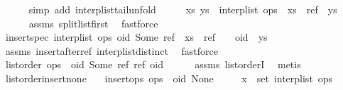 \begin{isabellebody}
\ \ \ \ \isamarkupfalse%
\ {\isacharparenleft}simp\ add{\isacharcolon}\ interp{\isacharunderscore}list{\isacharunderscore}tail{\isacharunderscore}unfold{\isacharparenright}\isanewline
\ \ \isamarkupfalse%
\ \isamarkupfalse%
\ xs\ ys\ \ {\isachardoublequoteopen}interp{\isacharunderscore}list\ ops\ {\isacharequal}\ xs\ {\isacharat}\ {\isacharbrackleft}ref{\isacharbrackright}\ {\isacharat}\ ys{\isachardoublequoteclose}\isanewline
\ \ \ \ \isamarkupfalse%
\ assms{\isacharparenleft}{}{\isacharparenright}\ split{\isacharunderscore}list{\isacharunderscore}first\ \isamarkupfalse%
\ fastforce\isanewline
\ \ \isamarkupfalse%
\ {\isachardoublequoteopen}insert{\isacharunderscore}spec\ {\isacharparenleft}interp{\isacharunderscore}list\ ops{\isacharparenright}\ {\isacharparenleft}oid{\isacharcomma}\ Some\ ref{\isacharparenright}\ {\isacharequal}\ xs\ {\isacharat}\ {\isacharbrackleft}ref{\isacharbrackright}\ {\isacharat}\ {\isacharbrackleft}{\isacharbrackright}\ {\isacharat}\ {\isacharbrackleft}oid{\isacharbrackright}\ {\isacharat}\ ys{\isachardoublequoteclose}\isanewline
\ \ \ \ \isamarkupfalse%
\ assms{\isacharparenleft}{}{\isacharparenright}\ insert{\isacharunderscore}after{\isacharunderscore}ref\ interp{\isacharunderscore}list{\isacharunderscore}distinct\ \isamarkupfalse%
\ fastforce\isanewline
\ \ \isamarkupfalse%
\ \isamarkupfalse%
\ {\isachardoublequoteopen}list{\isacharunderscore}order\ {\isacharparenleft}ops\ {\isacharat}\ {\isacharbrackleft}{\isacharparenleft}oid{\isacharcomma}\ Some\ ref{\isacharparenright}{\isacharbrackright}{\isacharparenright}\ ref\ oid{\isachardoublequoteclose}\isanewline
\ \ \ \ \isamarkupfalse%
\ assms{\isacharparenleft}{}{\isacharparenright}\ list{\isacharunderscore}orderI\ \isamarkupfalse%
\ metis\isanewline
{}\isamarkupfalse%
%
\endisatagproof
{\isafoldproof}%
%
\isadelimproof
\isanewline
%
\endisadelimproof
\isanewline
{}\isamarkupfalse%
\ list{\isacharunderscore}order{\isacharunderscore}insert{\isacharunderscore}none{\isacharcolon}\isanewline
\ \ \ {\isachardoublequoteopen}insert{\isacharunderscore}ops\ {\isacharparenleft}ops\ {\isacharat}\ {\isacharbrackleft}{\isacharparenleft}oid{\isacharcomma}\ None{\isacharparenright}{\isacharbrackright}{\isacharparenright}{\isachardoublequoteclose}\isanewline
\ \ \ \ \ {\isachardoublequoteopen}x\ {\isasymin}\ set\ {\isacharparenleft}interp{\isacharunderscore}list\ ops{\isacharparenright}{\isachardoublequoteclose}\isanewline

\end{isabellebody}
